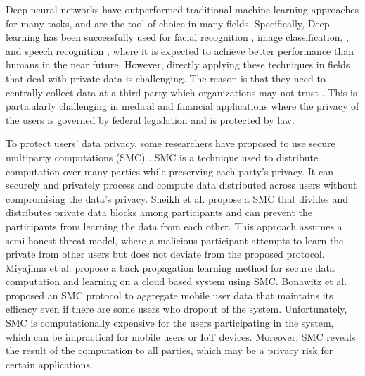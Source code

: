 \documentclass[conference]{IEEEtran}
\begin{document}
Deep neural networks have outperformed traditional machine learning approaches for many tasks, and are the tool of choice in many
fields. Specifically, Deep learning has been successfully used for facial recognition \cite{krizhevsky2012imagenet, sun2014deep, ding2015robust}, image classification, 
\cite{simard2003best, ma2015hyperspectral, zhong2011bilinear}, and speech recognition \cite{hinton2012deep, graves2013speech, noda2015audio}, where it is expected to achieve better
performance than humans in the near future. However, directly applying these techniques in fields that deal with private data is
challenging. The reason is that they need to centrally collect data at a third-party which organizations may not trust
\cite{chicurel2000databasing}. This is particularly challenging in medical and financial applications where the privacy of the users is
governed by federal legislation and is protected by law. 


To protect users' data privacy, some researchers have proposed to use secure multiparty computations (SMC) 
\cite{vaidya2003leveraging,7040943, ma2018privacy}. SMC is a technique used to distribute computation over many parties while preserving each party's privacy. It can securely and privately process and compute data distributed across users without compromising the data's privacy.
Sheikh et al. \cite{sheikh2010distributed} propose a SMC that divides and distributes private data blocks among participants and can
prevent the participants from learning the data from  each other. This approach assumes a semi-honest threat model,
where a malicious  participant attempts to learn the private from other users but does not deviate from the proposed
protocol. 
Miyajima et al. \cite{miyajima2016new} propose a back propagation learning method for secure data computation and learning on a cloud
based system using SMC. %
Bonawitz et al. \cite{bonawitz2017practical}  proposed an SMC protocol to aggregate mobile user data that maintains its efficacy even if there are some users who dropout of the system. 
Unfortunately, SMC is computationally expensive for the users participating in the system, which can be impractical for mobile users or IoT devices. Moreover, SMC reveals the result of the computation to all parties, which may be a privacy risk for certain
applications. 
\end{document}
